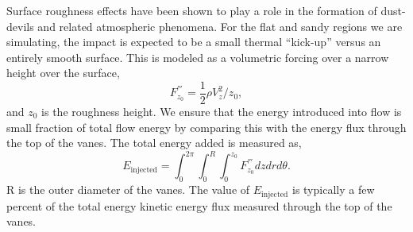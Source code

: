 Surface roughness effects have been shown to play a role in the
formation of dust-devils and related atmospheric
phenomena\cite{oke1987boundary}. For the flat and sandy regions we are
simulating, the impact is expected to be a small thermal ``kick-up''
versus an entirely smooth surface. This is modeled as a volumetric 
forcing over a narrow height over the surface, 
\begin{equation}
 F^{'''}_{z_0} = \frac{1}{2}\rho V_z^2/z_{0}, 
\end{equation}
and $z_{0}$ is the roughness height. We ensure that the energy
introduced into flow is small fraction of total flow energy by comparing
this with the energy flux through the top of the vanes. The total energy
added is measured as,  
\begin{equation}
 E_{\text{injected}} = \int_0^{2\pi} \int_0^R \int_0^{z_0} F^{'''}_{z_0} dz dr d\theta. 
\end{equation}
R is the outer diameter of the vanes. 
The value of $E_{\text{injected}}$ is typically a few percent of the
total energy kinetic energy flux measured through the top of the
vanes.

